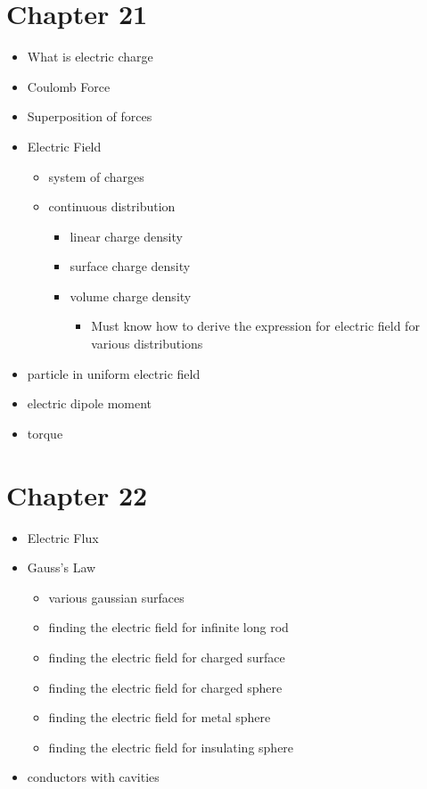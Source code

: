 \documentclass[a4paper]{article}
\begin{document}
\section*{Chapter 21}
\begin{itemize}
  \item What is electric charge
  \item Coulomb Force
  \item Superposition of forces
  \item Electric Field
  \begin{itemize}
    \item system of charges
    \item continuous distribution
    \begin{itemize}
      \item linear charge density
      \item surface charge density
      \item volume charge density
      \begin{itemize}
        \item Must know how to derive the expression for electric field for various distributions
      \end{itemize}
    \end{itemize}
  \end{itemize}
  \item particle in uniform electric field
  \item electric dipole moment
  \item torque
\end{itemize}
\newpage
\section*{Chapter 22}
\begin{itemize}
  \item Electric Flux
  \item Gauss's Law
  \begin{itemize}
    \item various gaussian surfaces
    \item finding the electric field for infinite long rod
    \item finding the electric field for charged surface
    \item finding the electric field for charged sphere
    \item finding the electric field for metal sphere
    \item finding the electric field for  insulating sphere
  \end{itemize}
  \item conductors with cavities
\end{itemize}
\newpage
\end{document}

